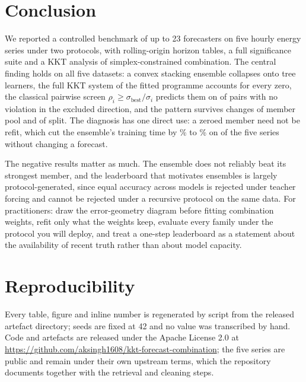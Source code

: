 \documentclass[journal]{IEEEtran}
\newif\iffullversion
\begin{document}
\section{Conclusion}
We reported a controlled benchmark of up to 23 forecasters on five hourly energy series under two protocols, with rolling-origin horizon tables, a full significance suite and a KKT analysis of simplex-constrained combination. The central finding holds on all five datasets: a convex stacking ensemble collapses onto tree learners, the full KKT system of the fitted programme accounts for every zero, the classical pairwise screen $\rho_i \geq \sigma_{\mathrm{best}}/\sigma_i$ predicts them on \nAgree{} of \nNonLeading{} pairs with no violation in the excluded direction, and the pattern survives changes of member pool and of split. The diagnosis has one direct use: a zeroed member need not be refit, which cut the ensemble's training time by \% to \% on \nRefitSavedWord{} of the five series without changing a forecast.

The negative results matter as much. The ensemble does not reliably beat its strongest member, and the leaderboard that motivates ensembles is largely protocol-generated, since equal accuracy across \friedKOne{} models is rejected under teacher forcing and cannot be rejected under a recursive protocol on the same data. For practitioners: draw the error-geometry diagram before fitting combination weights, refit only what the weights keep, evaluate every family under the protocol you will deploy, and treat a one-step leaderboard as a statement about the availability of recent truth rather than about model capacity.

\iffullversion
\appendices
\section{Per-Dataset Rolling-Origin Results}
Table~\ref{tab:app} gives rolling-origin test RMSE at each horizon for every model, averaged over 24 forecast origins per dataset.
\begin{table}[!tb]
\caption{Rolling-origin test RMSE by horizon $h$, 24 origins per dataset, best per column in bold. Units: kW (UCI, OPSD-H), MW (OPSD-N), degrees (ETT).}
\label{tab:app}
\centering
\tiny
\setlength{\tabcolsep}{1.6pt}

\end{table}
\fi

\section*{Reproducibility}
Every table, figure and inline number is regenerated by script from the released artefact directory; seeds are fixed at 42 and no value was transcribed by hand. Code and artefacts are released under the Apache License 2.0 at \url{https://github.com/aksingh1608/kkt-forecast-combination}; the five series are public and remain under their own upstream terms, which the repository documents together with the retrieval and cleaning steps.
\end{document}
